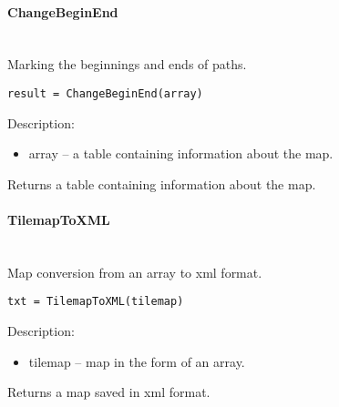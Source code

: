 \paragraph{ChangeBeginEnd} \hspace{0pt} \\
Marking the beginnings and ends of paths.
\begin{lstlisting}[style=Matlab-editor]
result = ChangeBeginEnd(array)
\end{lstlisting}

Description:
\begin{itemize}
\item  array -- a table containing information about the map.
\end{itemize}

Returns a table containing information about the map.

\paragraph{TilemapToXML} \hspace{0pt} \\
Map conversion from an array to xml format.
\begin{lstlisting}[style=Matlab-editor]
txt = TilemapToXML(tilemap)
\end{lstlisting}

Description:
\begin{itemize}
\item  tilemap -- map in the form of an array.
\end{itemize}

Returns a map saved in xml format.

